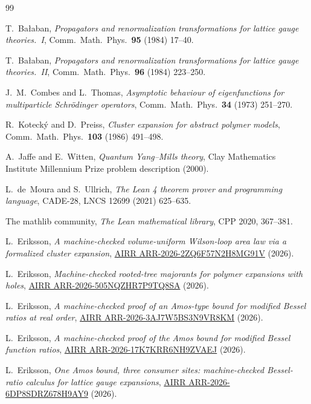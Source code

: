 \documentclass[11pt]{article}
\theoremstyle{definition}
\begin{document}
\begin{thebibliography}{99}

T.~Ba{\l}aban,
\emph{Propagators and renormalization transformations for lattice gauge
theories.~I},
Comm.\ Math.\ Phys.\ \textbf{95} (1984) 17--40.

T.~Ba{\l}aban,
\emph{Propagators and renormalization transformations for lattice gauge
theories.~II},
Comm.\ Math.\ Phys.\ \textbf{96} (1984) 223--250.

J.~M.~Combes and L.~Thomas,
\emph{Asymptotic behaviour of eigenfunctions for multiparticle
Schr\"odinger operators},
Comm.\ Math.\ Phys.\ \textbf{34} (1973) 251--270.

R.~Koteck\'y and D.~Preiss,
\emph{Cluster expansion for abstract polymer models},
Comm.\ Math.\ Phys.\ \textbf{103} (1986) 491--498.

A.~Jaffe and E.~Witten,
\emph{Quantum Yang--Mills theory},
Clay Mathematics Institute Millennium Prize problem description (2000).

L.~de~Moura and S.~Ullrich,
\emph{The Lean 4 theorem prover and programming language},
CADE-28, LNCS 12699 (2021) 625--635.

The mathlib community,
\emph{The Lean mathematical library},
CPP 2020, 367--381.

L.~Eriksson,
\emph{A machine-checked volume-uniform Wilson-loop area law via a
formalized cluster expansion},
\href{https://airr.science/papers/ARR-2026-2ZQ6F57N2H8MG91V/}{AIRR ARR-2026-2ZQ6F57N2H8MG91V} (2026).

L.~Eriksson,
\emph{Machine-checked rooted-tree majorants for polymer expansions with
holes},
\href{https://airr.science/papers/ARR-2026-505NQZHR7P9TQ8SA/}{AIRR ARR-2026-505NQZHR7P9TQ8SA} (2026).

L.~Eriksson,
\emph{A machine-checked proof of an Amos-type bound for modified Bessel
ratios at real order},
\href{https://airr.science/papers/ARR-2026-3AJ7W5BS3N9VR8KM/}{AIRR ARR-2026-3AJ7W5BS3N9VR8KM} (2026).

L.~Eriksson,
\emph{A machine-checked proof of the Amos bound for modified Bessel
function ratios},
\href{https://airr.science/papers/ARR-2026-17K7KRR6NH9ZVAEJ/}{AIRR ARR-2026-17K7KRR6NH9ZVAEJ} (2026).

L.~Eriksson,
\emph{One Amos bound, three consumer sites: machine-checked
Bessel-ratio calculus for lattice gauge expansions},
\href{https://airr.science/papers/ARR-2026-6DP8SDRZ678H9AY9/}{AIRR ARR-2026-6DP8SDRZ678H9AY9} (2026).


\end{thebibliography}
\end{document}
